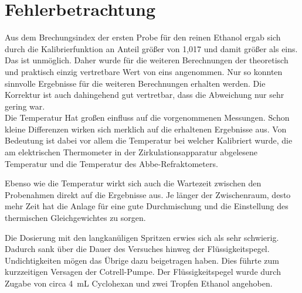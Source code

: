 \section{Fehlerbetrachtung}
\label{sec:fehler}

Aus dem Brechungsindex der ersten Probe für den reinen Ethanol ergab sich durch die Kalibrierfunktion an Anteil größer von 1,017 und damit größer als eins. Das ist unmöglich. Daher wurde für die weiteren Berechnungen der theoretisch und praktisch einzig vertretbare Wert von eins angenommen. Nur so konnten sinnvolle Ergebnisse für die weiteren Berechnungen erhalten werden. Die Korrektur ist auch dahingehend gut vertretbar, dass die Abweichung nur sehr gering war.\\


Die Temperatur Hat großen einfluss auf die vorgenommenen Messungen. Schon kleine Differenzen wirken sich merklich auf die erhaltenen Ergebnisse aus. Von Bedeutung ist dabei vor allem die Temperatur bei welcher Kalibriert wurde, die am elektrischen Thermometer in der Zirkulationsapparatur abgelesene Temperatur und die Temperatur des Abbe-Refraktometers.

Ebenso wie die Temperatur wirkt sich auch die Wartezeit zwischen den Probenahmen direkt auf die Ergebnisse aus. Je länger der Zwischenraum, desto mehr Zeit hat die Anlage für eine gute Durchmischung und die Einstellung des thermischen Gleichgewichtes zu sorgen.

Die Dosierung mit den langkanüligen Spritzen erwies sich als sehr schwierig. Dadurch sank über die Dauer des Versuches hinweg der Flüssigkeitspegel. Undichtigkeiten mögen das Übrige dazu beigetragen haben. Dies führte zum kurzzeitigen Versagen der Cotrell-Pumpe. Der Flüssigkeitspegel wurde durch Zugabe von circa \SI{4}{\milli\liter} Cyclohexan und zwei Tropfen Ethanol angehoben. 


